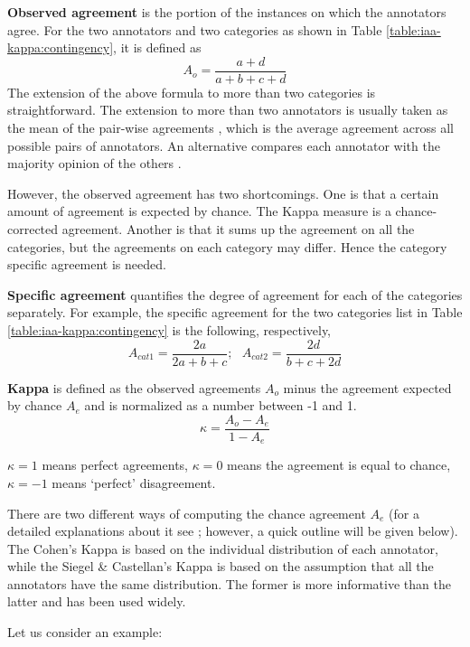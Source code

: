 {\bf Observed agreement} is the portion of the instances on which the 
annotators agree. For the two annotators and two categories as shown in
 Table \ref{table:iaa-kappa:contingency}, it is defined as
\begin{equation}
A_{o} = \frac{a+d}{a+b+c+d}
\end{equation}
The extension of the above formula to more than two categories is 
straightforward. The extension to more than two annotators is usually taken 
as the mean of the pair-wise agreements \cite{Fleiss75}, which is the average agreement 
across all possible pairs of annotators. 
An alternative compares each annotator with the majority opinion of the others 
\cite{Fleiss75}.

However, the observed agreement has two shortcomings. One is that a certain 
amount of agreement is expected by chance. The Kappa measure is a chance-corrected 
agreement. Another is that it sums up the agreement on all the categories, but 
the agreements on each category may differ. Hence the category specific agreement 
is needed.

{\bf Specific agreement} quantifies the degree of agreement for each of the categories 
separately. For example, the specific agreement for the two categories list in 
Table \ref{table:iaa-kappa:contingency} is the following, respectively,
\begin{equation}
A_{cat1} = \frac{2a}{2a+b+c}; \ \ \
A_{cat2} = \frac{2d}{b+c+2d}
\end{equation}

{\bf Kappa} is defined as the observed agreements $A_{o}$ minus the agreement 
expected by chance $A_{e}$ and is normalized as a number between -1 and 1.
\begin{equation}
\kappa =\frac{A_{o}-A_{e}}{1-A_{e}}
\end{equation}

$\kappa=1$ means perfect agreements, $\kappa=0$ means the agreement is equal to 
chance, $\kappa=-1$ means `perfect' disagreement.

There are two different ways of computing the chance agreement $A_{e}$ (for a
detailed explanations about it see \cite{Eugenio04}; however, a quick outline
will be given below). The Cohen's Kappa is based on the individual distribution
of each annotator, while the Siegel \& Castellan's Kappa is based on the
assumption that all the annotators have the same distribution. The former is more
informative than the latter and has been used widely.

Let us consider an example:

